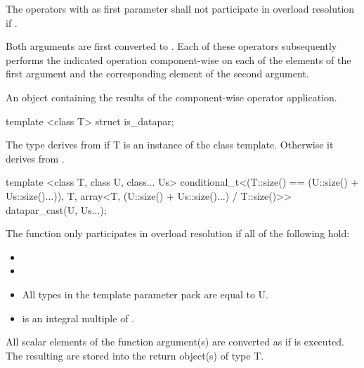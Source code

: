 \begin{wgText}
\begin{itemdescr}
    \pnum\remarks The operators with  as first parameter shall not participate in overload resolution if .

    \pnum\effects Both arguments are first converted to .
      Each of these operators subsequently performs the indicated operation component-wise on each of the elements of the first argument and the corresponding element of the second argument.

    \pnum\returns An object containing the results of the component-wise operator application.
  \end{itemdescr}

  \begin{itemdecl}
template <class T> struct is_datapar;
  \end{itemdecl}
  \begin{itemdescr}
    \pnum\effects The  type derives from  if \type T is an instance of the \datapar class template.
    Otherwise it derives from .
  \end{itemdescr}

  \begin{itemdecl}
template <class T, class U, class... Us>
conditional_t<(T::size() == (U::size() + Us::size()...)), T,
              array<T, (U::size() + Us::size()...) / T::size()>> datapar_cast(U, Us...);
  \end{itemdecl}
  \begin{itemdescr}
    \pnum\remarks The  function only participates in overload resolution if all of the following hold:
    \begin{itemize}
      \item {}
      \item {}
      \item All types in the template parameter pack  are equal to \type U.
      \item {} is an integral multiple of .
    \end{itemize}

    \pnum\effects All scalar elements  of the function argument(s) are converted as if
     is executed.
    The resulting  are stored into the return object(s) of type \type T.


\end{itemdescr}
\end{wgText}
